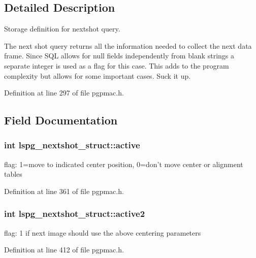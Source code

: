 \subsection{Detailed Description}
Storage definition for nextshot query. 

The next shot query returns all the information needed to collect the next data frame. Since S\-Q\-L allows for null fields independently from blank strings a separate integer is used as a flag for this case. This adds to the program complexity but allows for some important cases. Suck it up. 

Definition at line 297 of file pgpmac.\-h.



\subsection{Field Documentation}
\hypertarget{structlspg__nextshot__struct_a1a94eefbad713976a3d9213695a6ca28}{
\subsubsection[{active}]{\setlength{\rightskip}{0pt plus 5cm}int lspg\-\_\-nextshot\-\_\-struct\-::active}}\label{structlspg__nextshot__struct_a1a94eefbad713976a3d9213695a6ca28}


flag\-: 1=move to indicated center position, 0=don't move center or alignment tables 



Definition at line 361 of file pgpmac.\-h.

\hypertarget{structlspg__nextshot__struct_a2875aa18df587806a3d8c05220fd62b5}{
\subsubsection[{active2}]{\setlength{\rightskip}{0pt plus 5cm}int lspg\-\_\-nextshot\-\_\-struct\-::active2}}\label{structlspg__nextshot__struct_a2875aa18df587806a3d8c05220fd62b5}


flag\-: 1 if next image should use the above centering parameters 



Definition at line 412 of file pgpmac.\-h.

